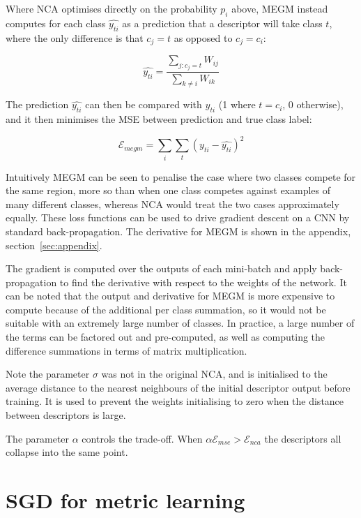 Where \gls{NCA} optimises directly on the probability $ p_{i} $ above, \gls{MEGM} instead computes for each class $ \hat{y_{ti}} $ as a prediction that a descriptor will take class $ t $, where the only difference is that $ c_j = t $ as opposed to $ c_j = c_i $:

\begin{equation}
\label{eq:megm_pred}
\hat{y_{ti}} = \frac{\sum_{j:c_j = t}W_{ij}}{\sum_{k \neq i}{W_{ik}}}
\end{equation}

The prediction $ \hat{y_{ti}} $ can then be compared with $ y_{ti} $ (1 where $ t = c_i $, 0 otherwise), and it then minimises the \gls{MSE} between prediction and true class label:

\begin{equation}
\label{eq:megm_loss}
\mathcal{E}_{megm} =  \sum_i\sum_t{(y_{ti} - \hat{y_{ti}})^2}
\end{equation}

Intuitively \gls{MEGM} can be seen to penalise the case where two classes compete for the same region,  more so than when one class competes against examples of many different classes, whereas \gls{NCA} would treat the two cases approximately equally. These loss functions can be used to drive gradient descent on a \gls{CNN} by standard back-propagation. The derivative for \gls{MEGM} is shown in the appendix, section~\ref{sec:appendix}.

The gradient is computed over the outputs of each mini-batch and apply back-propagation to find the derivative with respect to the weights of the network. It can be noted that the output and derivative for \gls{MEGM} is more expensive to compute because of the additional per class summation, so it would not be suitable with an extremely large number of classes. In practice, a large number of the terms can be factored out and pre-computed, as well as computing the difference summations in terms of matrix multiplication.

Note the parameter $ \sigma $ was not in the original \gls{NCA}, and is initialised to the average distance to the nearest neighbours of the initial descriptor output before training. It is used to prevent the weights initialising to zero when the distance between descriptors is large.


The parameter $\alpha $ controls the trade-off. When $ \alpha \mathcal{E}_{mse} > \mathcal{E}_{nca} $ the descriptors all collapse into the same point.


\section{SGD for metric learning}

